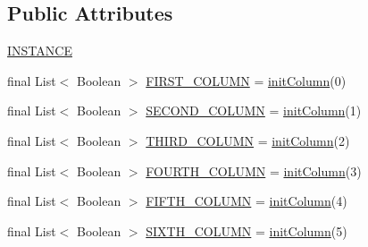 \subsection*{Public Attributes}
\begin{DoxyCompactItemize}
\item 
\mbox{\hyperlink{enumcom_1_1chess_1_1engine_1_1classic_1_1board_1_1_board_utils_ac27de729aefc5b097112f712f110ef4f}{I\+N\+S\+T\+A\+N\+CE}}
\item 
final List$<$ Boolean $>$ \mbox{\hyperlink{enumcom_1_1chess_1_1engine_1_1classic_1_1board_1_1_board_utils_a8d6543714fe537d1a8feae414fcbd292}{F\+I\+R\+S\+T\+\_\+\+C\+O\+L\+U\+MN}} = \mbox{\hyperlink{enumcom_1_1chess_1_1engine_1_1classic_1_1board_1_1_board_utils_a93ed19969015a1b866999ea08fa43cb3}{init\+Column}}(0)
\item 
final List$<$ Boolean $>$ \mbox{\hyperlink{enumcom_1_1chess_1_1engine_1_1classic_1_1board_1_1_board_utils_ad9318357de9002219841e8ff2e719b68}{S\+E\+C\+O\+N\+D\+\_\+\+C\+O\+L\+U\+MN}} = \mbox{\hyperlink{enumcom_1_1chess_1_1engine_1_1classic_1_1board_1_1_board_utils_a93ed19969015a1b866999ea08fa43cb3}{init\+Column}}(1)
\item 
final List$<$ Boolean $>$ \mbox{\hyperlink{enumcom_1_1chess_1_1engine_1_1classic_1_1board_1_1_board_utils_aaaeaac479235ba0d70898e0d18d22f20}{T\+H\+I\+R\+D\+\_\+\+C\+O\+L\+U\+MN}} = \mbox{\hyperlink{enumcom_1_1chess_1_1engine_1_1classic_1_1board_1_1_board_utils_a93ed19969015a1b866999ea08fa43cb3}{init\+Column}}(2)
\item 
final List$<$ Boolean $>$ \mbox{\hyperlink{enumcom_1_1chess_1_1engine_1_1classic_1_1board_1_1_board_utils_a0ad97ad2ee0708d15555e43e0576bece}{F\+O\+U\+R\+T\+H\+\_\+\+C\+O\+L\+U\+MN}} = \mbox{\hyperlink{enumcom_1_1chess_1_1engine_1_1classic_1_1board_1_1_board_utils_a93ed19969015a1b866999ea08fa43cb3}{init\+Column}}(3)
\item 
final List$<$ Boolean $>$ \mbox{\hyperlink{enumcom_1_1chess_1_1engine_1_1classic_1_1board_1_1_board_utils_a66842e7b52c94d0639f3620fb85675b1}{F\+I\+F\+T\+H\+\_\+\+C\+O\+L\+U\+MN}} = \mbox{\hyperlink{enumcom_1_1chess_1_1engine_1_1classic_1_1board_1_1_board_utils_a93ed19969015a1b866999ea08fa43cb3}{init\+Column}}(4)
\item 
final List$<$ Boolean $>$ \mbox{\hyperlink{enumcom_1_1chess_1_1engine_1_1classic_1_1board_1_1_board_utils_a9372beec288eace348fdce5f2fca876a}{S\+I\+X\+T\+H\+\_\+\+C\+O\+L\+U\+MN}} = \mbox{\hyperlink{enumcom_1_1chess_1_1engine_1_1classic_1_1board_1_1_board_utils_a93ed19969015a1b866999ea08fa43cb3}{init\+Column}}(5)

\end{DoxyCompactItemize}
